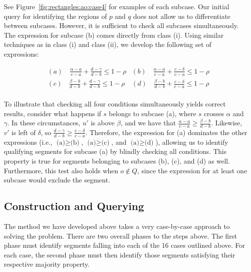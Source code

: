 See Figure~\ref{fig:rectangles:ao:case4} for examples of each subcase. Our initial query for identifying the regions of $p$ and $q$ does not allow us to differentiate between subcases. However, it is sufficient to check all subcases simultaneously. The expression for subcase (b) comes directly from class (i).  Using similar techniques as in class (i) and class (ii), we develop the following set of expressions:

\begin{align*}
& (a) \quad \frac{\alpha - a}{c - a} + \frac{d - \gamma}{d - b} \leq 1 - \rho
& (b) \quad \frac{\alpha - a}{c - a} + \frac{c - \delta}{c - a} \leq 1 - \rho \\
& (c) \quad \frac{\beta  - b}{d - b} + \frac{d - \gamma}{d - b} \leq 1 - \rho  
& (d) \quad \frac{\beta  - b}{d - b} + \frac{c - \delta}{c - a} \leq 1 - \rho \\
\end{align*}

To illustrate that checking all four conditions simultaneously yields correct results, consider what happens if $s$ belongs to subcase (a), where $s$ crosses $\alpha$ and $\gamma$. In these circumstances, $u'$ is above $\beta$, and we have that $\frac{\alpha - a}{c - a} \geq \frac{\beta - b}{d - b}$.  Likewise, $v'$ is left of $\delta$, so $\frac{d - \gamma}{d - b} \geq \frac{c - \delta}{c - a}$.  Therefore, the expression for (a) dominates the other expressions (i.e., $\text{(a)} \geq \text{(b)}$, $\text{(a)} \geq \text{(c)}$, and $\text{(a)} \geq \text{(d)}$), allowing us to identify qualifying segments for subcase (a) by blindly checking all conditions. This property is true for segments belonging to subcases (b), (c), and (d) as well. Furthermore, this test also holds when $o \not \in Q$, since the expression for at least one subcase would exclude the segment.


\subsection{Construction and Querying}
\label{:rectangles:ao:analysis}

The method we have developed above takes a very case-by-case approach to solving the problem. There are two overall phases to the steps above. The first phase must identify segments falling into each of the 16 cases outlined above. For each case, the second phase must then identify those segments satisfying their respective majority property. 

